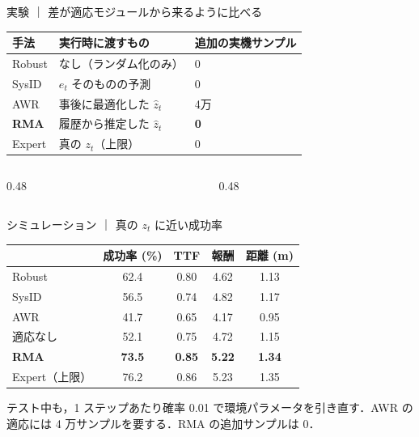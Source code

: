 \documentclass[aspectratio=169,10pt,t]{beamer}
\begin{document}
\begin{frame}{実験 ｜ 差が適応モジュールから来るように比べる}
  \centering
  {\footnotesize
  \begin{tabular}{lll}
    \toprule
    手法 & 実行時に渡すもの & 追加の実機サンプル \\
    \midrule
    Robust & なし（ランダム化のみ） & 0 \\
    SysID & $e_t$ そのものの予測 & 0 \\
    AWR & 事後に最適化した $\hat z_t$ & 4万 \\
    \textbf{RMA} & 履歴から推定した $\hat z_t$ & \textbf{0} \\
    \midrule
    Expert & 真の $z_t$（上限） & 0 \\
    \bottomrule
  \end{tabular}}

  \vspace{0.7em}
  \raggedright
  \begin{columns}[T,onlytextwidth]
    \begin{column}{0.48\textwidth}
    \end{column}
    \hfill
    \begin{column}{0.48\textwidth}
    \end{column}
  \end{columns}

\end{frame}

\begin{frame}{シミュレーション ｜ 真の $z_t$ に近い成功率}
  \vspace{0.2em}
  \centering
  {\footnotesize
  \begin{tabular}{lcccc}
    \toprule
     & 成功率 (\%) & TTF & 報酬 & 距離 (m) \\
    \midrule
    Robust & 62.4 & 0.80 & 4.62 & 1.13 \\
    SysID & 56.5 & 0.74 & 4.82 & 1.17 \\
    AWR & 41.7 & 0.65 & 4.17 & 0.95 \\
    適応なし & 52.1 & 0.75 & 4.72 & 1.15 \\
    \textbf{RMA} & \textbf{73.5} & \textbf{0.85} & \textbf{5.22} & \textbf{1.34} \\
    \midrule
    Expert（上限） & 76.2 & 0.86 & 5.23 & 1.35 \\
    \bottomrule
  \end{tabular}}

  \vspace{0.7em}
  \raggedright
  {\small
  テスト中も，1 ステップあたり確率 0.01 で環境パラメータを引き直す．AWR の適応には 4 万サンプルを要する．RMA の追加サンプルは 0．}

\end{frame}
\end{document}
